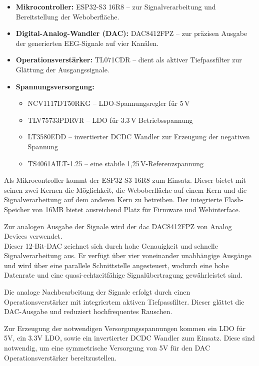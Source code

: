 \begin{itemize} 
    \item \textbf{Mikrocontroller:} ESP32-S3 16R8 – zur Signalverarbeitung und Bereitstellung der Weboberfläche. 
    \item \textbf{Digital-Analog-Wandler (DAC):} DAC8412FPZ – zur präzisen Ausgabe der generierten EEG-Signale auf vier Kanälen. 
    \item \textbf{Operationsverstärker:} TL071CDR – dient als aktiver Tiefpassfilter zur Glättung der Ausgangssignale. 
    \item \textbf{Spannungsversorgung:}
    \begin{itemize}
        \item NCV1117DT50RKG – LDO-Spannungsregler für 5 V
        \item TLV75733PDRVR – LDO für 3.3 V Betriebsspannung
        \item LT3580EDD – invertierter DCDC Wandler zur Erzeugung der negativen Spannung
        \item TS4061AILT-1.25 – eine stabile 1{,}25\,V-Referenzspannung 
    \end{itemize}
\end{itemize}

Als Mikrocontroller kommt der ESP32-S3 16R8 zum Einsatz. Dieser bietet mit seinen zwei Kernen die Möglichkeit, die Weboberfläche auf einem Kern und die Signalverarbeitung auf dem anderen Kern zu betreiben. Der integrierte Flash-Speicher von 16MB bietet ausreichend Platz für Firmware und Webinterface.

Zur analogen Ausgabe der Signale wird der \gls{dac} DAC8412FPZ von Analog Devices verwendet.\\
Dieser 12-Bit-DAC zeichnet sich durch hohe Genauigkeit und schnelle Signalverarbeitung aus.
Er verfügt über vier voneinander unabhängige Ausgänge und wird über eine parallele Schnittstelle angesteuert, wodurch eine hohe Datenrate und eine quasi-echtzeitfähige Signalübertragung gewährleistet sind.

Die analoge Nachbearbeitung der Signale erfolgt durch einen Operationsverstärker mit integriertem aktiven Tiefpassfilter. Dieser glättet die DAC-Ausgabe und reduziert hochfrequentes Rauschen.

Zur Erzeugung der notwendigen Versorgungsspannungen kommen ein LDO für 5V, ein 3.3V LDO, sowie ein invertierter DCDC Wandler zum Einsatz. Diese sind notwendig, um eine symmetrische Versorgung von \pm 5V für den DAC Operationsverstärker bereitzustellen.

